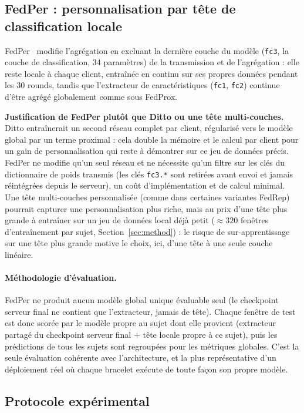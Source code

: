 \documentclass{acmart}
\begin{document}
\subsection{FedPer : personnalisation par tête de classification locale}
\label{subsec:fedper}

FedPer~\cite{arivazhagan2019federated} modifie l'agrégation en excluant la
dernière couche du modèle (\texttt{fc3}, la couche de classification, 34
paramètres) de la transmission et de l'agrégation : elle reste locale à
chaque client, entraînée en continu sur ses propres données pendant les 30
rounds, tandis que l'extracteur de caractéristiques (\texttt{fc1},
\texttt{fc2}) continue d'être agrégé globalement comme sous FedProx.

\textbf{Justification de FedPer plutôt que Ditto ou une tête
multi-couches.} Ditto entraînerait un second réseau complet par
client, régularisé vers le modèle global par un terme proximal :
cela double la mémoire et le calcul par client pour un gain de
personnalisation qui reste à démontrer sur ce jeu de données précis. FedPer
ne modifie qu'un seul réseau et ne nécessite qu'un filtre sur les clés du
dictionnaire de poids transmis (les clés \texttt{fc3.*} sont retirées avant
envoi et jamais réintégrées depuis le serveur), un coût d'implémentation et
de calcul minimal. Une tête multi-couches personnalisée (comme dans
certaines variantes FedRep) pourrait capturer une personnalisation plus
riche, mais au prix d'une tête plus grande à entraîner sur un jeu de données
local déjà petit ($\approx 320$ fenêtres d'entraînement par sujet,
Section~\ref{sec:method}) : le risque de sur-apprentissage sur une tête plus
grande motive le choix, ici, d'une tête à une seule couche linéaire.

\paragraph{Méthodologie d'évaluation.} FedPer ne produit aucun modèle global
unique évaluable seul (le checkpoint serveur final ne contient que
l'extracteur, jamais de tête). Chaque fenêtre de test est donc scorée par le
modèle propre au sujet dont elle provient (extracteur partagé du checkpoint
serveur final + tête locale propre à ce sujet), puis les prédictions de tous
les sujets sont regroupées pour les métriques globales. C'est la seule
évaluation cohérente avec l'architecture, et la plus représentative d'un
déploiement réel où chaque bracelet exécute de toute façon son propre
modèle.

\subsection{Protocole expérimental}
\label{subsec:protocol}
\end{document}

